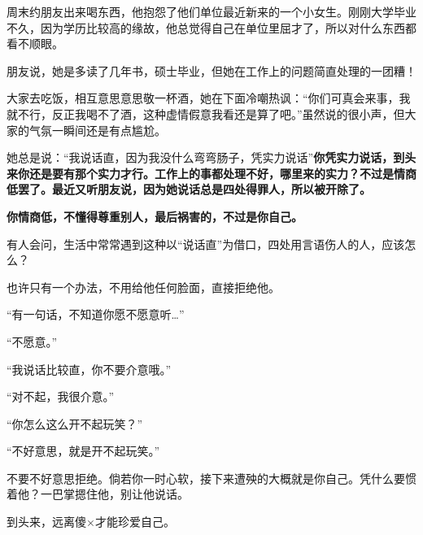 \documentclass[UTF8,a4paper,8pt]{ctexart}
\begin{document}
 
 周末约朋友出来喝东西，他抱怨了他们单位最近新来的一个小女生。刚刚大学毕业不久，因为学历比较高的缘故，他总觉得自己在单位里屈才了，所以对什么东西都看不顺眼。
 
 朋友说，她是多读了几年书，硕士毕业，但她在工作上的问题简直处理的一团糟！
 
 大家去吃饭，相互意思意思敬一杯酒，她在下面冷嘲热讽：“你们可真会来事，我就不行，反正我喝不了酒，这种虚情假意我看还是算了吧。”虽然说的很小声，但大家的气氛一瞬间还是有点尴尬。
 
 她总是说：“我说话直，因为我没什么弯弯肠子，凭实力说话”\textbf{你凭实力说话，到头来你还是要有那个实力才行。工作上的事都处理不好，哪里来的实力？不过是情商低罢了。最近又听朋友说，因为她说话总是四处得罪人，所以被开除了。}
 
 \textbf{你情商低，不懂得尊重别人，最后祸害的，不过是你自己。}
 
 有人会问，生活中常常遇到这种以“说话直”为借口，四处用言语伤人的人，应该怎么？
 
 也许只有一个办法，不用给他任何脸面，直接拒绝他。
 
 “有一句话，不知道你愿不愿意听…”
 
 “不愿意。”
 
 “我说话比较直，你不要介意哦。”
 
 “对不起，我很介意。”
 
 “你怎么这么开不起玩笑？”
 
 “不好意思，就是开不起玩笑。”
 
 不要不好意思拒绝。倘若你一时心软，接下来遭殃的大概就是你自己。凭什么要惯着他？一巴掌摁住他，别让他说话。
 
 到头来，远离傻×才能珍爱自己。
 
 \newpage
\end{document}
